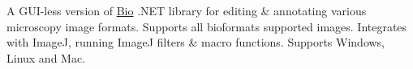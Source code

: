 A GUI-\/less version of \mbox{\hyperlink{namespace_bio}{Bio}} .NET library for editing \& annotating various microscopy image formats. Supports all bioformats supported images. Integrates with ImageJ, running ImageJ filters \& macro functions. Supports Windows, Linux and Mac. 